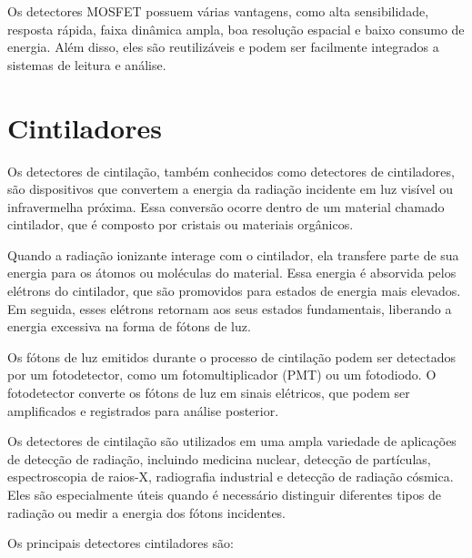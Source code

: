 \documentclass[11pt,a4paper]{article}
\begin{document}
		Os detectores MOSFET possuem várias vantagens, como alta sensibilidade, resposta rápida, faixa dinâmica ampla, boa resolução espacial e baixo consumo de energia. Além disso, eles são reutilizáveis e podem ser facilmente integrados a sistemas de leitura e análise.

	\section{Cintiladores}

		Os detectores de cintilação, também conhecidos como detectores de cintiladores, são dispositivos que convertem a energia da radiação incidente em luz visível ou infravermelha próxima. Essa conversão ocorre dentro de um material chamado cintilador, que é composto por cristais ou materiais orgânicos.

		Quando a radiação ionizante interage com o cintilador, ela transfere parte de sua energia para os átomos ou moléculas do material. Essa energia é absorvida pelos elétrons do cintilador, que são promovidos para estados de energia mais elevados. Em seguida, esses elétrons retornam aos seus estados fundamentais, liberando a energia excessiva na forma de fótons de luz.
	
		Os fótons de luz emitidos durante o processo de cintilação podem ser detectados por um fotodetector, como um fotomultiplicador (PMT) ou um fotodiodo. O fotodetector converte os fótons de luz em sinais elétricos, que podem ser amplificados e registrados para análise posterior.

		Os detectores de cintilação são utilizados em uma ampla variedade de aplicações de detecção de radiação, incluindo medicina nuclear, detecção de partículas, espectroscopia de raios-X, radiografia industrial e detecção de radiação cósmica. Eles são especialmente úteis quando é necessário distinguir diferentes tipos de radiação ou medir a energia dos fótons incidentes.
			
		Os principais detectores cintiladores são:
\end{document}
